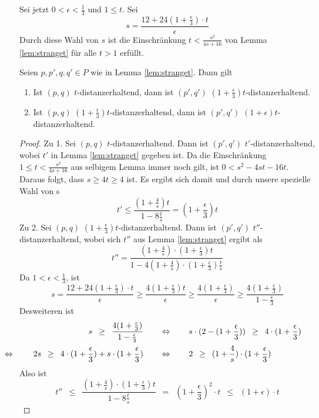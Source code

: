     Sei jetzt $0 < \epsilon < \frac{1}{3}$ und $1 \leq t$. Sei 
    \[s = \frac{12 + 24(1 + \frac{\epsilon}{3})\cdot t}{\epsilon}\]
    Durch diese Wahl von $s$ ist die Einschränkung $t < \frac{s^2}{4s + 16}$ von Lemma \ref{lem:stranget} für alle $t > 1$ erfüllt.
    
    \begin{lemma}
    	\label{lem:tepsilon}
    	Seien $p, p', q, q' \in P$ wie in Lemma \ref{lem:stranget}. Dann gilt
    	\begin{enumerate}
    		\item Ist $(p, q)$ $t$-distanzerhaltend, dann ist $(p', q')$ $(1 + \frac{\epsilon}{3})t$-distanzerhaltend.
    		\item Ist $(p, q)$ $(1 + \frac{\epsilon}{3})t$-distanzerhaltend, dann ist $(p', q')$ $(1 + \epsilon)t$-distanzerhaltend.
    	\end{enumerate}
    \end{lemma}
    \begin{proof}
    	Zu 1. Sei $(p, q)$ $t$-distanzerhaltend. Dann ist $(p', q')$ $t'$-distanzerhaltend, wobei $t'$ in Lemma \ref{lem:stranget} gegeben ist. Da die Einschränkung $1 \leq t < \frac{s^2}{4s + 16}$ aus selbigem Lemma immer noch gilt, ist $0 < s^2 - 4st - 16t$. Daraus folgt, dass $s \geq 4t \geq 4$ ist. Es ergibt sich damit und durch unsere spezielle Wahl von s 
    	\[t' \leq \frac{(1 + \frac{4}{s})t}{1 - 8 \frac{t}{s}} = (1+ \frac{\epsilon}{3})t\]
    	Zu 2. Sei $(p, q)$ $(1+ \frac{\epsilon}{3})t$-distanzerhaltend. Dann ist $(p', q')$ $t''$-distanzerhaltend, wobei sich $t''$ aus Lemma \ref{lem:stranget} ergibt als 
    	\[t'' = \frac{(1+\frac{4}{s})\cdot (1 + \frac{\epsilon}{3})t}{1 - 4(1 + \frac{4}{s})\cdot (1 + \frac{\epsilon}{3})\frac{t}{s}}\]
    	Da $1 < \epsilon < \frac{1}{3}$, ist
    	\[
	    	s = \frac{12 + 24(1 + \frac{\epsilon}{3})\cdot t}{\epsilon} \geq \frac{4 (1 + \frac{\epsilon}{3})t}{\epsilon}
    		\geq\frac{4 (1 + \frac{\epsilon}{3})}{\epsilon}
    		\geq\frac{4 (1 + \frac{\epsilon}{3})}{1 - \frac{\epsilon}{3}}
    		\]
    	Desweiteren ist 
    	\begin{align*}    	
	    	s\enspace\geq\enspace\frac{4 (1 + \frac{\epsilon}{3})}{1 - \frac{\epsilon}{3}}\qquad
	    	&\Leftrightarrow \qquad s \cdot (2 - (1 + \frac{\epsilon}{3}))\enspace\geq\enspace 4 \cdot(1 + \frac{\epsilon}{3})
	    	\\2s \enspace\geq\enspace 4 \cdot(1 + \frac{\epsilon}{3}) + s \cdot (1 + \frac{\epsilon}{3}) \qquad
	    	&\Leftrightarrow \qquad 2 \enspace\geq\enspace (1 + \frac{4}{s})\cdot(1 + \frac{\epsilon}{3})
	    	\tag*{\llap{\makebox[\linewidth][l]{$\Leftrightarrow$}}}
    	\end{align*}
    	Also ist 
    	\[
	    	t'' \enspace\leq\enspace \frac{(1 + \frac{4}{s})\cdot (1 + \frac{\epsilon}{3})t}{1 - 8 \frac{t}{s}}
	    	\enspace=\enspace (1 + \frac{\epsilon}{3})^2\cdot t \enspace\leq\enspace (1 + \epsilon)\cdot t
    	\]
    \end{proof}
